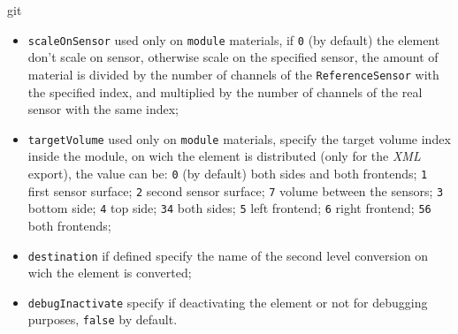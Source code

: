 git\documentclass[12pt, a4paper]{article}
\newcommand{\prop}[1]{\texttt{#1}}
\begin{document}
\begin{itemize}
\begin{itemize}
\begin{itemize}
    \item \prop{scaleOnSensor} used only on \prop{module} materials,
      if \prop{0} (by default) the element don't scale on sensor,
      otherwise scale on the specified sensor, the amount of material
      is divided by the number of channels of the
      \prop{ReferenceSensor} with the specified index, and multiplied
      by the number of channels of the real sensor with the same
      index;
    \item \prop{targetVolume} used only on \prop{module} materials,
      specify the target volume index inside the module, on wich the
      element is distributed (only for the \emph{XML} export), the value can
      be: \prop{0} (by default) both sides and both frontends;
      \prop{1} first sensor surface; \prop{2} second sensor surface;
      \prop{7} volume between the sensors; \prop{3} bottom side;
      \prop{4} top side; \prop{34} both sides; \prop{5} left frontend;
      \prop{6} right frontend; \prop{56} both frontends;
    \item \prop{destination} if defined specify the name of the second
      level conversion on wich the element is converted;
    \item \prop{debugInactivate} specify if deactivating the element
      or not for debugging purposes, \prop{false} by default.
    \end{itemize}
  \end{itemize}
\end{itemize}
\end{document}

